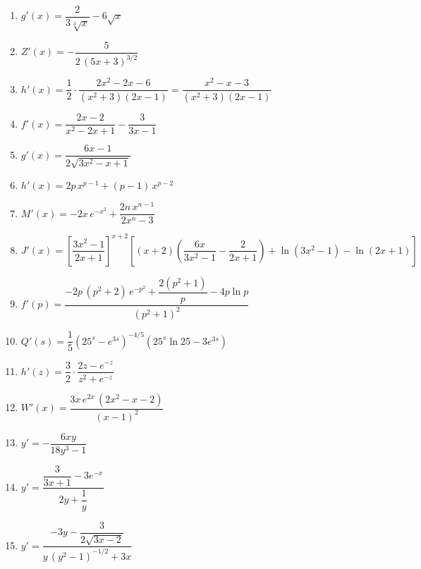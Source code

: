 \documentclass[12pt, letterpaper]{article}
\begin{document}
\begin{enumerate}[leftmargin=*, label=\textbf{\arabic*.}]
    \item $g'(x) = \dfrac{2}{3\sqrt[3]{x}} - 6\sqrt{x}$

    \item $Z'(x) = -\dfrac{5}{2\,(5x+3)^{3/2}}$

    \item $h'(x) = \dfrac{1}{2}\cdot\dfrac{2x^{2} - 2x - 6}{(x^{2}+3)(2x-1)} = \dfrac{x^{2} - x - 3}{(x^{2}+3)(2x-1)}$

    \item $f'(x) = \dfrac{2x-2}{x^{2}-2x+1} - \dfrac{3}{3x-1}$

    \item $g'(x) = \dfrac{6x-1}{2\sqrt{3x^{2}-x+1}}$

    \item $h'(x) = 2p\,x^{p-1} + (p-1)\,x^{p-2}$

    \item $M'(x) = -2x\,e^{-x^{2}} + \dfrac{2n\,x^{n-1}}{2x^{n}-3}$

    \item $J'(x) = \left[\dfrac{3x^{2}-1}{2x+1}\right]^{x+2}\left[(x+2)\left(\dfrac{6x}{3x^{2}-1} - \dfrac{2}{2x+1}\right) + \ln(3x^{2}-1) - \ln(2x+1)\right]$

    \item $f'(p) = \dfrac{-2p\,(p^{2}+2)\,e^{-p^{2}} + \dfrac{2(p^{2}+1)}{p} - 4p\ln p}{(p^{2}+1)^{2}}$

    \item $Q'(s) = \dfrac{1}{5}\left(25^{s} - e^{3s}\right)^{-4/5}\left(25^{s}\ln 25 - 3e^{3s}\right)$

    \item $h'(z) = \dfrac{3}{2}\cdot\dfrac{2z - e^{-z}}{z^{2} + e^{-z}}$

    \item $W'(x) = \dfrac{3x\,e^{2x}\,(2x^{2} - x - 2)}{(x-1)^{2}}$

    \item $y' = -\dfrac{6xy}{18y^{3} - 1}$

    \item $y' = \dfrac{\dfrac{3}{3x+1} - 3e^{-x}}{2y + \dfrac{1}{y}}$

    \item $y' = \dfrac{-3y - \dfrac{3}{2\sqrt{3x-2}}}{y\,(y^{2}-1)^{-1/2} + 3x}$

  \end{enumerate}
\fi
\end{document}

